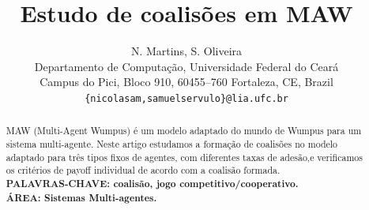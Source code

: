 \documentclass[11pt,reqno]{article}
\begin{document}
\pagestyle{empty}
\newtheorem{theorem}{Teorema}[section]
\newtheorem{cor}[theorem]{Corolário}
\newtheorem{lemma}[theorem]{Lema}
\newtheorem{fact}[theorem]{Fato}
\newtheorem{property}[theorem]{Propriedade}
\newtheorem{proposition}[theorem]{Proposição}
\newtheorem{definition}[theorem]{Definição}
\newtheorem{setup}[theorem]{Configuração}
\newtheorem{conjecture}[theorem]{Conjectura}

\theoremstyle{definition}
\newtheorem{example}[theorem]{Exemplo}
\newcommand\eps{\varepsilon}

\title{Estudo de coalisões em MAW}

\author{
N. Martins, S. Oliveira \vspace{15pt}\\
Departamento de Computação, Universidade Federal do Ceará\\
Campus do Pici, Bloco 910, 60455--760 Fortaleza, CE, Brazil \vspace{10pt}\\
{\small {\tt \{nicolasam,samuelservulo\}@lia.ufc.br}}
}

\date{}

\maketitle
\thispagestyle{empty}

\begin{abstract}
MAW (Multi-Agent Wumpus) é um modelo adaptado do mundo de Wumpus \cite{russel03} para um sistema multi-agente. Neste artigo estudamos a formação de
coalisões no modelo adaptado  para três tipos fixos de agentes, com diferentes taxas de adesão,e verificamos os critérios de payoff individual de acordo com
 a coalisão formada.
\vspace{1pt}\\
{\bf PALAVRAS-CHAVE: coalisão, jogo competitivo/cooperativo.\\ÁREA: Sistemas Multi-agentes.}\\
\end{abstract}
\end{document}
